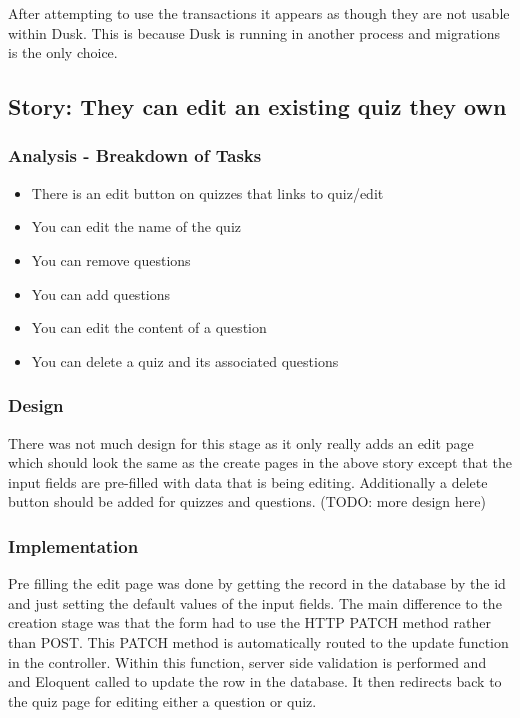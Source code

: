 After attempting to use the transactions it appears as though they are not usable within Dusk. This is because Dusk is running in another process and migrations is the only choice\cite{dusk-transactions}. 
\newpage

\subsection{Story: They can edit an existing quiz they own}
\subsubsection{Analysis - Breakdown of Tasks}
\begin{itemize}
	\item There is an edit button on quizzes that links to quiz/edit
	\item You can edit the name of the quiz
	\item You can remove questions
	\item You can add questions
	\item You can edit the content of a question
	\item You can delete a quiz and its associated questions
\end{itemize}
\subsubsection{Design}
There was not much design for this stage as it only really adds an edit page which should look the same as the create pages in the above story except that the input fields are pre-filled with data that is being editing. Additionally a delete button should be added for quizzes and questions. (TODO: more design here)
\subsubsection{Implementation}
Pre filling the edit page was done by getting the record in the database by the id and just setting the default values of the input fields. The main difference to the creation stage was that the form had to use the HTTP PATCH method rather than POST. This PATCH method is automatically routed to the update function in the controller\cite{laravel-resource-controller}. Within this function, server side validation is performed and and Eloquent called to update the row in the database. It then redirects back to the quiz page for editing either a question or quiz.


